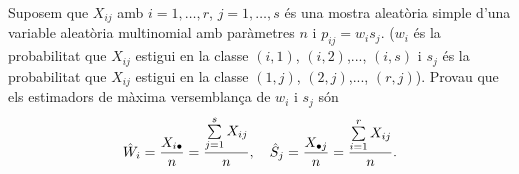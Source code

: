 \begin{probres}
{Suposem que $X_{ij}$ amb $i=1,\ldots,r$, $j=1,\ldots,s$ \'es una
mostra aleat\`oria simple d'una variable aleat\`oria multinomial amb par\`ametres $n$ i $p_{ij}=w_i s_j$. ($w_i$ \'es la
probabilitat que $X_{ij}$ estigui en la classe $(i,1)$, $(i,2)$,...,
$(i,s)$ i $s_j$ \'es la
probabilitat que $X_{ij}$ estigui en la classe $(1,j)$, $(2,j)$,...,
$(r,j)$). Provau que els estimadors de m\`axima versemblan\c{c}a de $w_i$ i $s_j$
s\'on
$$\hat W_i ={X_{i\bullet}\over n}={\sum\limits_{j=1}^s X_{ij}\over n},
\quad\hat S_j ={X_{\bullet j}\over n}={\sum\limits_{i=1}^r X_{ij}\over n}.$$}
\end{probres} 

